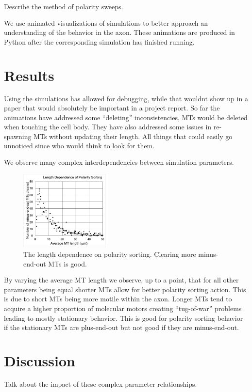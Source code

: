 \documentclass[]{biophysicist}
\begin{document}
Describe the method of polarity sweeps.

We use animated visualizations of simulations to better approach an understanding of the behavior in the axon. These animations are produced in Python after the corresponding simulation has finished running.

\section{Results}
Using the simulations has allowed for debugging, while that wouldnt show up in a paper that would absolutely be important in a project report. So far the animations have addressed some ``deleting'' inconsistencies, MTs would be deleted when touching the cell body. They have also addressed some issues in re-spawning MTs without updating their length. All things that could easily go unnoticed since who would think to look for them.

We observe many complex interdependencies between simulation parameters.
\begin{figure}
    \centering
    \includegraphics[width=0.4\textwidth]{figures/length_dependence.png}
    \caption{The length dependence on polarity sorting. Clearing more minus-end-out MTs is good.}
    \label{fig:lengthdep}
\end{figure}
By varying the average MT length we observe, up to a point, that for all other parameters being equal shorter MTs allow for better polarity sorting action. This is due to short MTs being more motile within the axon. Longer MTs tend to acquire a higher proportion of molecular motors creating ``tug-of-war'' problems leading to mostly stationary behavior. This is good for polarity sorting behavior if the stationary MTs are plus-end-out but not good if they are minus-end-out.

\section{Discussion}
Talk about the impact of these complex parameter relationships.
\end{document}
